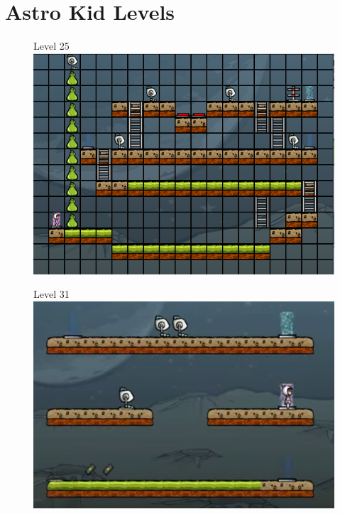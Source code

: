 \section{Astro Kid Levels}
\begin{figure}
	\centering
	\label{level25}
	Level 25
	\includegraphics[width=1.0\textwidth]{appendix/img/lvl25}
\end{figure}
\begin{figure}
	\centering
	\label{level31}
	Level 31
	\includegraphics[width=1.0\textwidth]{appendix/img/lvl31}
\end{figure}
